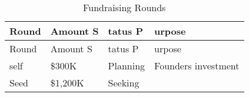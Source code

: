 \documentclass[10pt,openany]{book}
\begin{document}
\begin{longtable}[]{@{}llll@{}}
\caption{Fundraising Rounds}\tabularnewline
\toprule
\begin{minipage}[b]{0.13\columnwidth}\raggedright
Round\strut
\end{minipage} & \begin{minipage}[b]{0.10\columnwidth}\raggedright
Amount S\strut
\end{minipage} & \begin{minipage}[b]{0.10\columnwidth}\raggedright
tatus P\strut
\end{minipage} & \begin{minipage}[b]{0.55\columnwidth}\raggedright
urpose\strut
\end{minipage}\tabularnewline
\midrule
\endfirsthead
\toprule
\begin{minipage}[b]{0.13\columnwidth}\raggedright
Round\strut
\end{minipage} & \begin{minipage}[b]{0.10\columnwidth}\raggedright
Amount S\strut
\end{minipage} & \begin{minipage}[b]{0.10\columnwidth}\raggedright
tatus P\strut
\end{minipage} & \begin{minipage}[b]{0.55\columnwidth}\raggedright
urpose\strut
\end{minipage}\tabularnewline
\midrule
\endhead
\begin{minipage}[t]{0.13\columnwidth}\raggedright
self\strut
\end{minipage} & \begin{minipage}[t]{0.10\columnwidth}\raggedright
\$300K\strut
\end{minipage} & \begin{minipage}[t]{0.10\columnwidth}\raggedright
Planning\strut
\end{minipage} & \begin{minipage}[t]{0.55\columnwidth}\raggedright
Founders investment\strut
\end{minipage}\tabularnewline
\begin{minipage}[t]{0.13\columnwidth}\raggedright
Seed\strut
\end{minipage} & \begin{minipage}[t]{0.10\columnwidth}\raggedright
\$1,200K\strut
\end{minipage} & \begin{minipage}[t]{0.10\columnwidth}\raggedright
Seeking\strut
\end{minipage} & \begin{minipage}[t]{0.55\columnwidth}\raggedright

\end{minipage}
\end{longtable}
\end{document}
